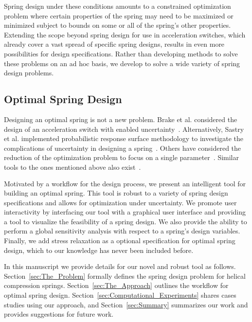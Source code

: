 \documentclass[10pt]{article}
\begin{document}
Spring design under these conditions amounts to a constrained optimization problem where certain properties of the spring may need to be maximized or minimized subject to bounds on some or all of the spring's other properties. Extending the scope beyond spring design for use in acceleration switches, which already cover a vast spread of specific spring designs, results in even more possibilities for design specifications. Rather than developing methods to solve these problems on an ad hoc basis, we develop to solve a wide variety of spring design problems. 

\subsection{Optimal Spring Design}
\label{subsec:Spring Design} 

Designing an optimal spring is not a new problem. Brake et al. considered the design of an acceleration switch with enabled uncertainty~\cite{IMSM2010}. Alternatively, Sastry et al. implemented probabilistic response surface methodology to investigate the complications of uncertainty in designing a spring~\cite{Reliability}. Others have considered the reduction of the optimization problem to focus on a single parameter~\cite{Robust}. Similar tools to the ones mentioned above also exist~\cite{Paredes}.

Motivated by a workflow for the design process, we present an intelligent tool for building an optimal spring. This tool is robust to a variety of spring design specifications and allows for optimization under uncertainty. We promote user interactivity by interfacing our tool with a graphical user interface and providing a tool to visualize the feasibility of a spring design. We also provide the ability to perform a global sensitivity analysis with respect to a spring's design variables. Finally, we add stress relaxation as a optional specification for optimal spring design, which to our knowledge has never been included before. 

In this manuscript we provide details for our novel and robust tool as follows. Section~\ref{sec:The_Problem} formally defines the spring design problem for helical compression springs. Section~\ref{sec:The_Approach} outlines the workflow for optimal spring design. Section~\ref{sec:Computational_Experiments} shares cases studies using our approach, and Section~\ref{sec:Summary} summarizes our work and provides suggestions for future work.
\end{document}
